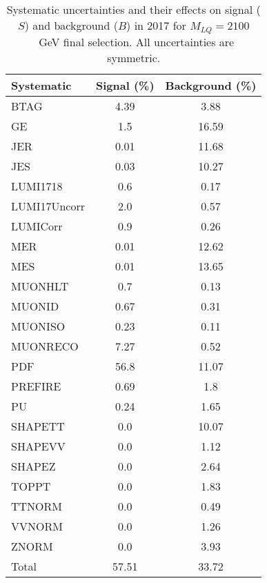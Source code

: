 \begin{table}[htbp]
\begin{center}
\caption{Systematic uncertainties and their effects on signal ($S$) and background ($B$) in 2017 for $M_{LQ}=2100$~GeV final selection. All uncertainties are symmetric.}
\begin{tabular}{lcc}
\hline\hline
Systematic & Signal (\%) & Background (\%) \\ \hline 
BTAG & 4.39 & 3.88\\ 
GE & 1.5 & 16.59\\ 
JER & 0.01 & 11.68\\ 
JES & 0.03 & 10.27\\ 
LUMI1718 & 0.6 & 0.17\\ 
LUMI17Uncorr & 2.0 & 0.57\\ 
LUMICorr & 0.9 & 0.26\\ 
MER & 0.01 & 12.62\\ 
MES & 0.01 & 13.65\\ 
MUONHLT & 0.7 & 0.13\\ 
MUONID & 0.67 & 0.31\\ 
MUONISO & 0.23 & 0.11\\ 
MUONRECO & 7.27 & 0.52\\ 
PDF & 56.8 & 11.07\\ 
PREFIRE & 0.69 & 1.8\\ 
PU & 0.24 & 1.65\\ 
SHAPETT & 0.0 & 10.07\\ 
SHAPEVV & 0.0 & 1.12\\ 
SHAPEZ & 0.0 & 2.64\\ 
TOPPT & 0.0 & 1.83\\ 
TTNORM & 0.0 & 0.49\\ 
VVNORM & 0.0 & 1.26\\ 
ZNORM & 0.0 & 3.93\\ 
Total & 57.51 & 33.72\\ \hline \hline
\end{tabular}
\label{tab:SysUncertainties_uujj_2100}
\end{center}
\end{table}

